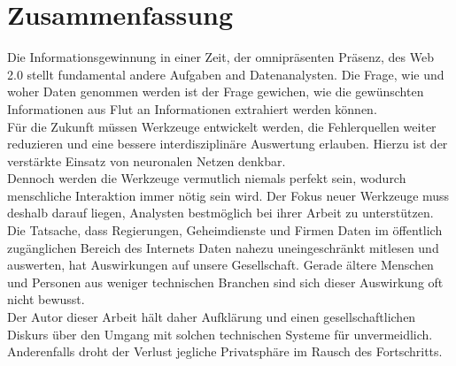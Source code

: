 \documentclass[twoside,a4paper]{article}
\begin{document}
\section{Zusammenfassung}
Die Informationsgewinnung in einer Zeit, der omnipräsenten Präsenz, des Web 2.0 stellt fundamental andere Aufgaben and Datenanalysten. Die Frage, wie und woher Daten genommen werden ist der Frage gewichen, wie die gewünschten Informationen aus Flut an Informationen extrahiert werden können.\\
Für die Zukunft müssen Werkzeuge entwickelt werden, die Fehlerquellen weiter reduzieren und eine bessere interdisziplinäre Auswertung erlauben. Hierzu ist der verstärkte Einsatz von neuronalen Netzen denkbar.\\
Dennoch werden die Werkzeuge vermutlich niemals perfekt sein, wodurch menschliche Interaktion immer nötig sein wird. Der Fokus neuer Werkzeuge muss deshalb darauf liegen, Analysten bestmöglich bei ihrer Arbeit zu unterstützen.\\
Die Tatsache, dass Regierungen, Geheimdienste und Firmen Daten im öffentlich zugänglichen Bereich des Internets Daten nahezu uneingeschränkt mitlesen und auswerten, hat Auswirkungen auf unsere Gesellschaft. Gerade ältere Menschen und Personen aus weniger technischen Branchen sind sich dieser Auswirkung oft nicht bewusst. \\
Der Autor dieser Arbeit hält daher Aufklärung und einen gesellschaftlichen Diskurs über den Umgang mit solchen technischen Systeme für unvermeidlich. Anderenfalls droht der Verlust jegliche Privatsphäre im Rausch des Fortschritts.


\nocite{*}

\end{document}
